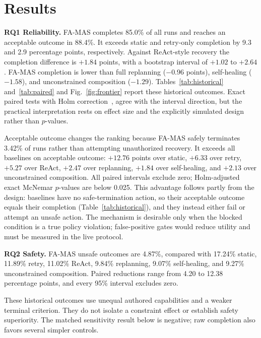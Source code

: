 \documentclass[10pt,journal,compsoc]{IEEEtran}
\newcommand{\famas}{FA-MAS}
\begin{document}
\section{Results}\label{sec:results}
\textbf{RQ1 Reliability.} \famas{} completes 85.0\% of all runs and reaches an acceptable outcome in 88.4\%. It exceeds static and retry-only completion by 9.3 and 2.9 percentage points, respectively. Against ReAct-style recovery the completion difference is $+1.84$ points, with a bootstrap interval of $+1.02$ to $+2.64$. \famas{} completion is lower than full replanning ($-0.96$ points), self-healing ($-1.58$), and unconstrained composition ($-1.29$). Tables~\ref{tab:historical} and~\ref{tab:paired} and Fig.~\ref{fig:frontier} report these historical outcomes. Exact paired tests with Holm correction~\cite{mcnemar1947}, \cite{holm1979} agree with the interval direction, but the practical interpretation rests on effect size and the explicitly simulated design rather than $p$-values.

Acceptable outcome changes the ranking because \famas{} safely terminates 3.42\% of runs rather than attempting unauthorized recovery. It exceeds all baselines on acceptable outcome: $+12.76$ points over static, $+6.33$ over retry, $+5.27$ over ReAct, $+2.47$ over replanning, $+1.84$ over self-healing, and $+2.13$ over unconstrained composition. All paired intervals exclude zero; Holm-adjusted exact McNemar $p$-values are below 0.025. This advantage follows partly from the design: baselines have no safe-termination action, so their acceptable outcome equals their completion (Table~\ref{tab:historical}), and they instead either fail or attempt an unsafe action. The mechanism is desirable only when the blocked condition is a true policy violation; false-positive gates would reduce utility and must be measured in the live protocol.

\textbf{RQ2 Safety.} \famas{} unsafe outcomes are 4.87\%, compared with 17.24\% static, 11.89\% retry, 11.02\% ReAct, 9.84\% replanning, 9.07\% self-healing, and 9.27\% unconstrained composition. Paired reductions range from 4.20 to 12.38 percentage points, and every 95\% interval excludes zero.

These historical outcomes use unequal authored capabilities and a weaker terminal criterion. They do not isolate a constraint effect or establish safety superiority. The matched sensitivity result below is negative; raw completion also favors several simpler controls.
\end{document}
